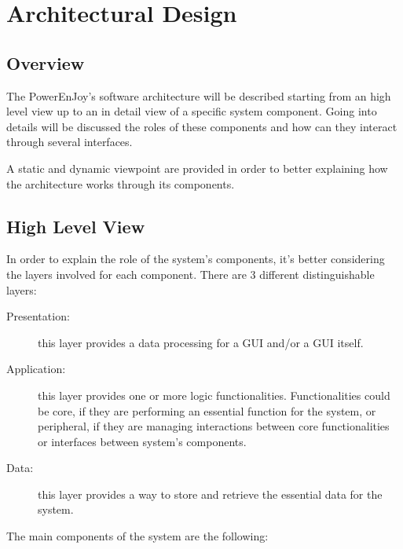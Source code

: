 \section{Architectural Design} \label{sec architectural design}

\subsection{Overview}

The PowerEnJoy's software architecture will be described starting from an high level view up to an in detail view of a specific system component. Going into details will be discussed the roles of these components and how can they interact through several interfaces.

A static and dynamic viewpoint are provided in order to better explaining how the architecture works through its components.

\subsection{High Level View}

In order to explain the role of the system's components, it's better considering the layers involved for each component.
There are 3 different distinguishable layers:

\begin{description}
	\item[{\color{green} Presentation}:] this layer provides a data processing for a GUI and/or a GUI itself.
	\item[{\color{blue} Application}:] this layer provides one or more logic functionalities. Functionalities could be core, if they are performing an essential function for the system, or peripheral, if they are managing interactions between core functionalities or interfaces between system's components.
	\item[{\color{red} Data}:] this layer provides a way to store and retrieve the essential data for the system.
\end{description}
The main components of the system are the following:

